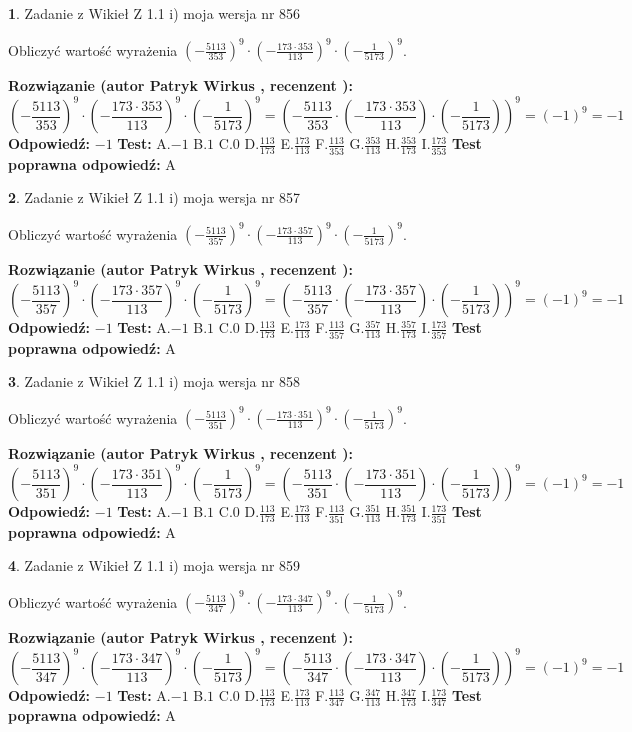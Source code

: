 \documentclass[12pt, a4paper]{article}
\theoremstyle{definition} %
\newtheorem{zad}{}
\newcommand{\zadStart}[1]{\begin{zad}#1\newline}
\newcommand{\zadStop}{\end{zad}}
\newcommand{\rozwStart}[2]{\noindent \textbf{Rozwiązanie (autor #1 , recenzent #2): }\newline}
\newcommand{\rozwStop}{\newline}
\newcommand{\odpStart}{\noindent \textbf{Odpowiedź:}\newline}
\newcommand{\odpStop}{\newline}
\newcommand{\testStart}{\noindent \textbf{Test:}\newline}
\newcommand{\testStop}{\newline}
\newcommand{\kluczStart}{\noindent \textbf{Test poprawna odpowiedź:}\newline}
\newcommand{\kluczStop}{\newline}
\begin{document}
\zadStart{Zadanie z Wikieł Z 1.1 i) moja wersja nr 856}

Obliczyć wartość wyrażenia $(-\frac{5113}{353})^{9} \cdot (-\frac{173 \cdot 353}{113})^{9} \cdot (-\frac{1}{5173})^{9}$.
\zadStop
\rozwStart{Patryk Wirkus}{}
$$(-\frac{5113}{353})^{9} \cdot (-\frac{173 \cdot 353}{113})^{9} \cdot (-\frac{1}{5173})^{9} = (-\frac{5113}{353} \cdot (-\frac{173 \cdot 353}{113}) \cdot (-\frac{1}{5173}))^{9} = (-1)^{9} = -1$$
\rozwStop
\odpStart
$-1$
\odpStop
\testStart
A.$-1$ B.$1$ C.$0$ D.$\frac{113}{173}$ E.$\frac{173}{113}$
F.$\frac{113}{353}$ G.$\frac{353}{113}$
H.$\frac{353}{173}$
I.$\frac{173}{353}$
\testStop
\kluczStart
A
\kluczStop



\zadStart{Zadanie z Wikieł Z 1.1 i) moja wersja nr 857}

Obliczyć wartość wyrażenia $(-\frac{5113}{357})^{9} \cdot (-\frac{173 \cdot 357}{113})^{9} \cdot (-\frac{1}{5173})^{9}$.
\zadStop
\rozwStart{Patryk Wirkus}{}
$$(-\frac{5113}{357})^{9} \cdot (-\frac{173 \cdot 357}{113})^{9} \cdot (-\frac{1}{5173})^{9} = (-\frac{5113}{357} \cdot (-\frac{173 \cdot 357}{113}) \cdot (-\frac{1}{5173}))^{9} = (-1)^{9} = -1$$
\rozwStop
\odpStart
$-1$
\odpStop
\testStart
A.$-1$ B.$1$ C.$0$ D.$\frac{113}{173}$ E.$\frac{173}{113}$
F.$\frac{113}{357}$ G.$\frac{357}{113}$
H.$\frac{357}{173}$
I.$\frac{173}{357}$
\testStop
\kluczStart
A
\kluczStop



\zadStart{Zadanie z Wikieł Z 1.1 i) moja wersja nr 858}

Obliczyć wartość wyrażenia $(-\frac{5113}{351})^{9} \cdot (-\frac{173 \cdot 351}{113})^{9} \cdot (-\frac{1}{5173})^{9}$.
\zadStop
\rozwStart{Patryk Wirkus}{}
$$(-\frac{5113}{351})^{9} \cdot (-\frac{173 \cdot 351}{113})^{9} \cdot (-\frac{1}{5173})^{9} = (-\frac{5113}{351} \cdot (-\frac{173 \cdot 351}{113}) \cdot (-\frac{1}{5173}))^{9} = (-1)^{9} = -1$$
\rozwStop
\odpStart
$-1$
\odpStop
\testStart
A.$-1$ B.$1$ C.$0$ D.$\frac{113}{173}$ E.$\frac{173}{113}$
F.$\frac{113}{351}$ G.$\frac{351}{113}$
H.$\frac{351}{173}$
I.$\frac{173}{351}$
\testStop
\kluczStart
A
\kluczStop



\zadStart{Zadanie z Wikieł Z 1.1 i) moja wersja nr 859}

Obliczyć wartość wyrażenia $(-\frac{5113}{347})^{9} \cdot (-\frac{173 \cdot 347}{113})^{9} \cdot (-\frac{1}{5173})^{9}$.
\zadStop
\rozwStart{Patryk Wirkus}{}
$$(-\frac{5113}{347})^{9} \cdot (-\frac{173 \cdot 347}{113})^{9} \cdot (-\frac{1}{5173})^{9} = (-\frac{5113}{347} \cdot (-\frac{173 \cdot 347}{113}) \cdot (-\frac{1}{5173}))^{9} = (-1)^{9} = -1$$
\rozwStop
\odpStart
$-1$
\odpStop
\testStart
A.$-1$ B.$1$ C.$0$ D.$\frac{113}{173}$ E.$\frac{173}{113}$
F.$\frac{113}{347}$ G.$\frac{347}{113}$
H.$\frac{347}{173}$
I.$\frac{173}{347}$
\testStop
\kluczStart
A
\kluczStop
\end{document}
